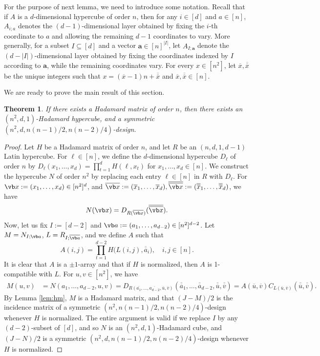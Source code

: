 \documentclass[11pt,oneside]{amsart}
\newtheorem{theorem}{Theorem}[section]
\newcommand*{\rttensor}[1]{\overline{\overline{#1}}}
\begin{document}
{For the purpose of next lemma, we need to introduce some notation.  Recall that if $A$ is a $d$-dimensional hypercube of order $n$, then for any $i \in [d]$ and $a \in [n]$,  $A_{i;a}$ denotes the $(d-1)$-dimensional layer obtained by fixing the $i$-th coordinate to $a$ and allowing the remaining $d-1$ coordinates to vary. More generally, for a subset $I \subseteq [d]$ and a vector $\mathbf{a} \in [n]^{|I|}$, let $A_{I;\mathbf{a}}$ denote the $(d - |I|)$-dimensional layer obtained by fixing the coordinates indexed by $I$ according to $\mathbf{a}$, while the remaining coordinates vary. For every $x\in [n^2]$, let $\overline x, \rttensor x$ be the unique integers such that  $x=(\overline x-1) n + \rttensor x$ and $\overline x, \rttensor x\in [n]$. 


 We are ready to prove the main result of this section.
\begin{theorem}\label{thm:hcubeproper}
    If there exists a Hadamard matrix of order $n$, then there exists an $(n^2,d,1)$-Hadamard hypercube, and a symmetric $(n^2,d, n(n-1)/2,n(n-2)/4)$-design. 
\end{theorem}
\begin{proof}
 Let $H$ be a Hadamard matrix of order $n$, and let $R$ be an $(n,d,1,d-1)$ Latin hypercube. For $\ell\in [n]$, we define the $d$-dimensional hypercube $D_\ell$ of order $n$ by $D_\ell(x_1,\ldots,x_d)=\prod_{t=1}^d H(\ell,x_t)$ for $x_1,\ldots, x_d\in [n]$. 
  We construct the hypercube $N$ of order $n^2$   by replacing each entry $\ell\in [n]$ in $R$ with $D_\ell$. For $\vb x:=(x_1,\dots,x_d)\in [n^2]^d$, and $\overline{\vb x}:=(\overline x_1,\dots, \overline x_d), \rttensor{\vb x}:=(\rttensor x_1,\dots,\rttensor x_d)$, we have
$$
N(\vb x)=D_{R(\overline{\vb x})}(\rttensor{\vb x}).
$$
Now, let us fix $I:=[d-2]$ and $\vb a:=(a_1,\dots, a_{d-2})\in [n^2]^{d-2}$. Let $M=N_{I;\vb a}$,  $L=R_{I;\overline{\vb a}}$, and we define $A$ such that
$$A(i,j)=\prod_{t=1}^{d-2} H\Big(L(i,j), \rttensor a_i\Big), \quad i,j\in [n].$$
It is clear that $A$ is a $\pm 1$-array and that if $H$ is normalized, then $A$ is 1-compatible with $L$. For $u,v\in [n^2]$, we have 
\begin{align*}
    M(u,v)&=N(a_1,\dots,a_{d-2},u,v)=D_{R(\overline{a_1},\dots,\overline{a_{d-2}},\overline{ u}, \overline{v})}(\rttensor a_1,\dots, \rttensor a_{d-2}, \rttensor u, \rttensor v)
   = A(\overline{ u}, \overline{v}) C_{L(\overline {u},\overline{v})}(\rttensor u, \rttensor v).
\end{align*}
By Lemma \ref{lem:hm}, $M$ is a Hadamard matrix, and that $(J-M)/2$ is the incidence matrix of a symmetric $(n^2,n(n-1)/2,n(n-2)/4)$-design whenever  $H$ is normalized. The entire argument is valid if we replace $I$ by any  $(d-2)$-subset of $[d]$, and so  $N$ is an $(n^2,d,1)$-Hadamard cube, and  $(J-N)/2$ is a symmetric $(n^2,d, n(n-1)/2,n(n-2)/4)$-design whenever $H$ is normalized.     
\end{proof}

}
\end{document}
